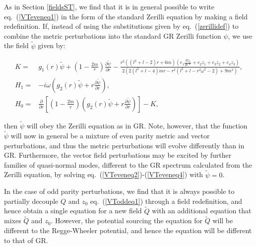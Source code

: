 \documentclass[10pt,twocolumn,preprintnumbers,amsmath,amssymb,nofootinbib
,superscriptaddress]{revtex4-1}
\begin{document}
{{{As in Section \ref{fieldsST}, we find that it is in general possible to write eq.~(\ref{VTeveneq1}) in the form of the standard Zerilli equation by making a field redefinition. If, instead of using the substitutions given by eq.~(\ref{zerillidef}) to combine the metric perturbations into the standard GR Zerilli function $\psi$, we use the field $\tilde{\psi}$ given by:
\begin{widetext}
\begin{align}
K=&g_1(r)\tilde{\psi}+\left(1-\frac{2m}{r}\right)\frac{\partial \tilde{\psi}}{\partial r}-\frac{r^2 \left(\left(l^2+l-2\right) r+6 m\right)\left(e_1\frac{dz_3}{dr\ast}+e_2z_1+e_3z_2+e_4z_3\right)}{2 \left(2 \left(l^2+l-4\right) m r-r^2
 \left(l^2+l-r^2 \omega ^2-2\right)+9 m^2\right)},\nonumber\\
H_1=&-i\omega \left(g_2(r)\tilde{\psi}+r\frac{\partial \tilde{\psi}}{\partial r}\right),\nonumber\\
H_0=&\frac{\partial}{\partial r}\left[\left(1-\frac{2m}{r}\right)\left(g_2(r)\tilde{\psi}+r\frac{\partial \tilde{\psi}}{\partial r}\right)\right]-K,\label{zerillidef}
\end{align}
\end{widetext}
then $\tilde{\psi}$ will obey the Zerilli equation as in GR. Note, however, that the function $\tilde{\psi}$ will now in general be a mixture of even parity metric and vector perturbations, and thus the metric perturbations will evolve differently than in GR. Furthermore, the vector field perturbations may be excited by further families of quasi-normal modes, different to the GR spectrum calculated from the Zerilli equation, by solving eq.~(\ref{VTeveneq2})-(\ref{VTeveneq4}) with $\tilde{\psi}=0$.

In the case of odd parity perturbations, we find that it is always possible to partially decouple $Q$ and $z_0$ eq.~(\ref{VToddeq1}) through a field redefinition, and hence obtain a single equation for a new field $\tilde{Q}$ with an additional equation that mixes $\tilde{Q}$ and $z_0$. However, the potential sourcing the equation for $\tilde{Q}$ will be different to the Regge-Wheeler potential, and hence the equation will be different to that of GR. 


}}}
\end{document}
